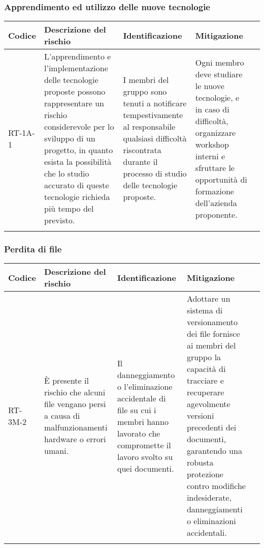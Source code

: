 \subsubsection{Apprendimento ed utilizzo delle nuove tecnologie} \label{sec:rischioTec}
\begin{table}[h]
    \centering
    \begin{tabularx}{\textwidth}{l>{\RaggedRight}X>{\RaggedRight}X>{\RaggedRight}X>{\RaggedRight}X}
    \toprule
    \rowcolor{gray!50}
    \textbf{Codice} & \textbf{Descrizione del rischio} & \textbf{Identificazione} & \textbf{Mitigazione} \\
    \midrule
    \addlinespace 
    RT-1A-1 & 
    L’apprendimento e l'implementazione delle tecnologie proposte possono rappresentare un rischio considerevole per lo  sviluppo di un progetto, in quanto esista la possibilità che lo studio accurato di queste tecnologie richieda più tempo del previsto.& 
    I membri del gruppo sono tenuti a notificare tempestivamente al responsabile qualsiasi difficoltà riscontrata durante il processo di studio delle tecnologie proposte. &
    Ogni membro deve studiare le nuove tecnologie, e in caso di difficoltà, organizzare workshop interni e sfruttare le opportunità di formazione dell'azienda proponente. \\
    \bottomrule
    \addlinespace 
    \end{tabularx}
\end{table}

\newpage
\subsubsection{Perdita di file}
\begin{table}[h]
    \centering
    \begin{tabularx}{\textwidth}{l>{\RaggedRight}X>{\RaggedRight}X>{\RaggedRight}X>{\RaggedRight}X}
    \toprule
    \rowcolor{gray!50}
    \textbf{Codice} & \textbf{Descrizione del rischio} & \textbf{Identificazione} & \textbf{Mitigazione} \\
    \midrule
    \addlinespace 
    RT-3M-2 & 
    È presente il rischio che alcuni file vengano persi a causa di malfunzionamenti hardware o errori umani. &
    Il danneggiamento o l'eliminazione accidentale di file su cui i membri hanno lavorato che compromette il lavoro svolto su quei documenti. &
    Adottare un sistema di versionamento dei file fornisce ai membri del gruppo la capacità di tracciare e recuperare agevolmente versioni precedenti dei documenti, garantendo una robusta protezione contro modifiche indesiderate, danneggiamenti o eliminazioni accidentali.\\
    \bottomrule
    \addlinespace 
    \end{tabularx}
\end{table}

